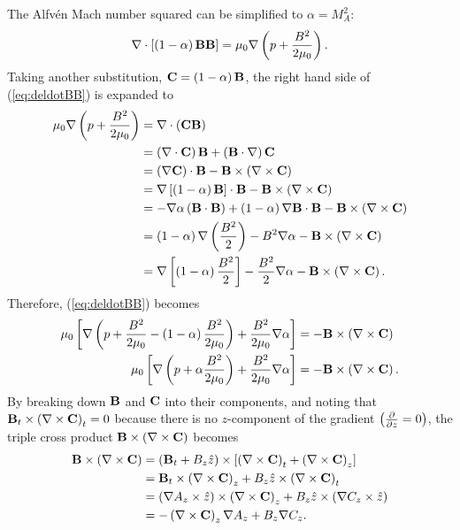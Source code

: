 The Alfv\'en Mach number squared can be simplified to $\alpha=M_A^2$:
\begin{equation}
    \nabla \cdot\left[ \left( 1-\alpha \right)\mathbf{B}\mathbf{B} \right] = \mu_0\nabla\left( p + \frac{B^2}{2\mu_0} \right).
    \label{eq:deldotBB}
\end{equation}
Taking another substitution, $\mathbf{C} = \left( 1-\alpha \right)\mathbf{B}$, the right hand side of (\ref{eq:deldotBB}) is expanded to
\[\begin{split}
    \mu_0\nabla\left( p + \frac{B^2}{2\mu_0} \right) &= \nabla \cdot\left( \mathbf{C}\mathbf{B} \right) \\
    &= \left( \nabla \cdot\mathbf{C} \right)\mathbf{B} + \left( \mathbf{B}\cdot\nabla \right)\mathbf{C} \\
    &= \left( \nabla \mathbf{C} \right)\cdot\mathbf{B} - \mathbf{B}\times\left( \nabla \times \mathbf{C} \right) \\
    &= \nabla\left[ \left( 1-\alpha \right)\mathbf{B} \right]\cdot\mathbf{B} - \mathbf{B}\times\left( \nabla \times \mathbf{C} \right) \\
    &= -\nabla\alpha\left( \mathbf{B}\cdot\mathbf{B} \right) + \left( 1-\alpha \right)\nabla\mathbf{B}\cdot\mathbf{B} - \mathbf{B}\times\left( \nabla \times \mathbf{C} \right) \\
    &= \left( 1-\alpha \right)\nabla\left( \frac{B^2}{2} \right) - B^2\nabla\alpha - \mathbf{B}\times\left( \nabla \times \mathbf{C} \right) \\
    &= \nabla\left[ \left( 1-\alpha \right)\frac{B^2}{2} \right] - \frac{B^2}{2}\nabla\alpha - \mathbf{B}\times\left( \nabla \times \mathbf{C} \right). \\
\end{split}\]
Therefore, (\ref{eq:deldotBB}) becomes
\begin{equation}
    \begin{split}
        \mu_0\left[ \nabla\left( p + \frac{B^2}{2\mu_0} - \left( 1-\alpha \right)\frac{B^2}{2\mu_0} \right) + \frac{B^2}{2\mu_0}\nabla\alpha \right] &= -\mathbf{B}\times\left( \nabla \times \mathbf{C} \right) \\
        \mu_0\left[ \nabla\left( p + \alpha\frac{B^2}{2\mu_0} \right) + \frac{B^2}{2\mu_0}\nabla\alpha \right] &= -\mathbf{B}\times\left( \nabla \times \mathbf{C} \right). \\
        \label{eq:B-cross-del-cross-C}
    \end{split}
\end{equation}
By breaking down $\mathbf{B}$ and $\mathbf{C}$ into their components, and noting that $\mathbf{B}_t \times \left( \nabla \times\mathbf{C} \right)_t =0$ because there is no $z$-component of the gradient $\left( \frac{\partial}{\partial z}=0 \right)$, the triple cross product $\mathbf{B}\times\left( \nabla \times\mathbf{C} \right)$ becomes
\[\begin{split}
    \mathbf{B}\times\left( \nabla \times\mathbf{C} \right) &= \left( \mathbf{B}_t + B_z\hat{z} \right)\times\left[ \left( \nabla \times\mathbf{C} \right)_t + \left( \nabla \times\mathbf{C} \right)_z \right] \\
    &= \mathbf{B}_t\times \left( \nabla \times\mathbf{C} \right)_z + B_z\hat{z}\times\left( \nabla \times\mathbf{C} \right)_t \\
    &= \left( \nabla A_z\times\hat{z} \right)\times \left( \nabla \times\mathbf{C} \right)_z + B_z\hat{z} \times \left( \nabla C_z\times\hat{z} \right) \\
    &= -\left( \nabla \times\mathbf{C} \right)_z\nabla A_z +  B_z\nabla C_z. \\
\end{split}\]
